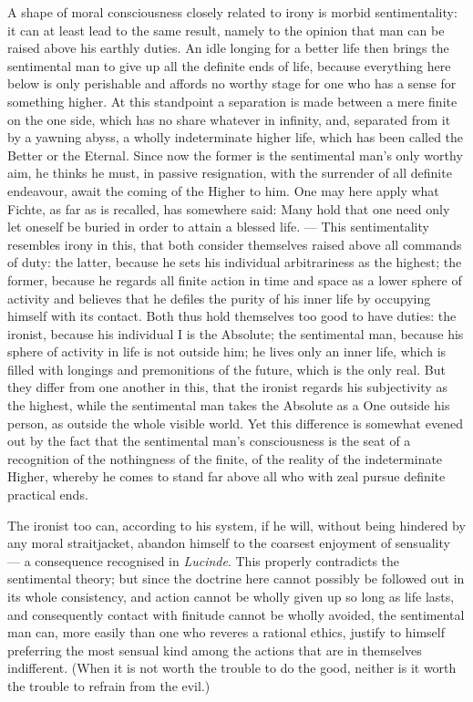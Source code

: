 \documentclass[12pt]{article}
\newcommand{\opage}[1]{\marginnote{\footnotesize\textit{[#1]}}}
\begin{document}
A shape of moral consciousness closely re\opage{157}lated to irony is morbid sentimentality: it can at least lead to the same result, namely to the opinion that man can be raised above his earthly duties. An idle longing for a better life then brings the sentimental man to give up all the definite ends of life, because everything here below is only perishable and affords no worthy stage for one who has a sense for something higher. At this standpoint a separation is made between a mere finite on the one side, which has no share whatever in infinity, and, separated from it by a yawning abyss, a wholly indeterminate higher life, which has been called the Better or the Eternal. Since now the former is the sentimental man's only worthy aim, he thinks he must, in passive resignation, with the surrender of all definite endeavour, await the coming of the Higher to him. One may here apply what Fichte, as far as is recalled, has somewhere said: Many hold that one need only let oneself be buried in order to attain a blessed life. --- This sentimentality resembles irony in this, that both consider themselves raised above all commands of duty: the latter, because he sets his individual arbitrariness as the highest; the former, because he regards all finite action in time and space as a lower sphere of activity and believes that he defiles the purity of his inner life by occupying himself with its contact. Both thus hold themselves too good to have duties: the ironist, because his individual I is the Absolute; the sentimental man, because his sphere of activity in life is not outside him; he lives only an inner life, which is filled with longings and premonitions of the future, which is the only real. But they differ from one another in this, that the ironist regards his subjectivity as the highest, while the sentimental man takes the Absolute as a One outside his person, as outside the whole visible world. Yet this difference is somewhat evened out by the fact that the sentimental man's consciousness is the seat of a recognition of the nothingness of the finite, of the reality of the indeterminate Higher, whereby he \opage{158}comes to stand far above all who with zeal pursue definite practical ends.

The ironist too can, according to his system, if he will, without being hindered by any moral straitjacket, abandon himself to the coarsest enjoyment of sensuality --- a consequence recognised in \emph{Lucinde}. This properly contradicts the sentimental theory; but since the doctrine here cannot possibly be followed out in its whole consistency, and action cannot be wholly given up so long as life lasts, and consequently contact with finitude cannot be wholly avoided, the sentimental man can, more easily than one who reveres a rational ethics, justify to himself preferring the most sensual kind among the actions that are in themselves indifferent. (When it is not worth the trouble to do the good, neither is it worth the trouble to refrain from the evil.)
\end{document}
